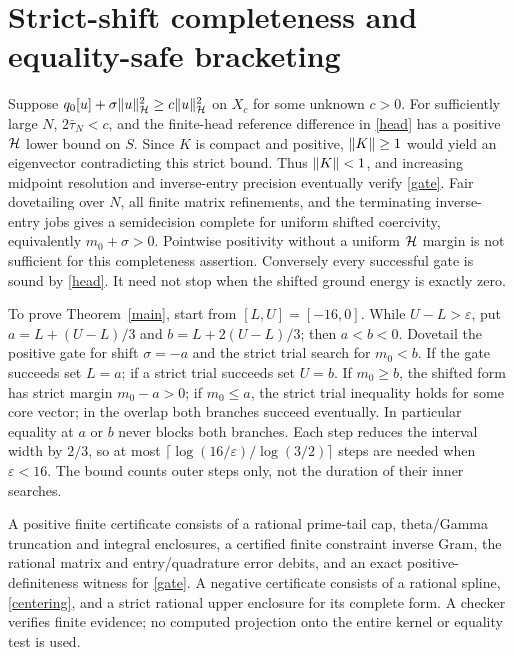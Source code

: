 \documentclass[11pt]{article}
\begin{document}
\section{Strict-shift completeness and equality-safe bracketing}\label{bracket}
Suppose $q_0[u]+\sigma\lVert u\rVert_{\mathcal H}^2\ge c\lVert u\rVert_{\mathcal H}^2$ on $X_c$ for some unknown $c>0$. For sufficiently large $N$, $2\bar\tau_N<c$, and the finite-head reference difference in \eqref{head} has a positive $\mathcal H$ lower bound on $S$. Since $K$ is compact and positive, $\lVert K\rVert\ge1$ would yield an eigenvector contradicting this strict bound. Thus $\lVert K\rVert<1$, and increasing midpoint resolution and inverse-entry precision eventually verify \eqref{gate}. Fair dovetailing over $N$, all finite matrix refinements, and the terminating inverse-entry jobs gives a semidecision complete for uniform shifted coercivity, equivalently $m_0+\sigma>0$. Pointwise positivity without a uniform $\mathcal H$ margin is not sufficient for this completeness assertion. Conversely every successful gate is sound by \eqref{head}. It need not stop when the shifted ground energy is exactly zero.

To prove Theorem~\ref{main}, start from $[L,U]=[-16,0]$. While $U-L>\varepsilon$, put $a=L+(U-L)/3$ and $b=L+2(U-L)/3$; then $a<b<0$. Dovetail the positive gate for shift $\sigma=-a$ and the strict trial search for $m_0<b$. If the gate succeeds set $L=a$; if a strict trial succeeds set $U=b$. If $m_0\ge b$, the shifted form has strict margin $m_0-a>0$; if $m_0\le a$, the strict trial inequality holds for some core vector; in the overlap both branches succeed eventually. In particular equality at $a$ or $b$ never blocks both branches. Each step reduces the interval width by $2/3$, so at most $\lceil\log(16/\varepsilon)/\log(3/2)\rceil$ steps are needed when $\varepsilon<16$. The bound counts outer steps only, not the duration of their inner searches.

A positive finite certificate consists of a rational prime-tail cap, theta/Gamma truncation and integral enclosures, a certified finite constraint inverse Gram, the rational matrix and entry/quadrature error debits, and an exact positive-definiteness witness for \eqref{gate}. A negative certificate consists of a rational spline, \eqref{centering}, and a strict rational upper enclosure for its complete form. A checker verifies finite evidence; no computed projection onto the entire kernel or equality test is used.
\end{document}
